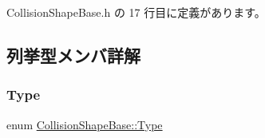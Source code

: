  Collision\+Shape\+Base.\+h の 17 行目に定義があります。



\subsection{列挙型メンバ詳解}
\mbox{\label{class_collision_shape_base_a8abcef092855ad0ca191047044b002cb}} 
\subsubsection{\texorpdfstring{Type}{Type}}
{\footnotesize\ttfamily enum \mbox{\hyperlink{class_collision_shape_base_a8abcef092855ad0ca191047044b002cb}{Collision\+Shape\+Base\+::\+Type}}}

